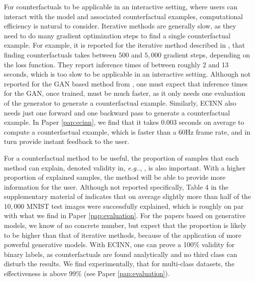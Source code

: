 \documentclass[11pt,a4paper,twoside,openright,final]{memoir}
\makeatletter
\DeclareRobustCommand\onedot{\futurelet\@let@token\@onedot}
\def\@onedot{\ifx\@let@token.\else.\null\fi\xspace}
\def\eg{\emph{e.g}\onedot} \def\Eg{\emph{E.g}\onedot}
\newcommand*{\paperref}[1]{Paper \hyperref[#1]{\ref{#1}}}
\makeatother
\begin{document}
For counterfactuals to be applicable in an interactive setting, where users can interact with the model and associated counterfactual examples, computational efficiency is natural to consider.
Iterative methods are generally slow, as they need to do many gradient optimization steps to find a single counterfactual example.
For example, it is reported for the iterative method described in \cite{VanLooveren2019}, that finding counterfactuals takes between $500$ and $5,000$ gradient steps, depending on the loss function. 
They report inference times of between roughly 2 and 13 seconds, which is too slow to be applicable in an interactive setting.
Although not reported for the GAN based method from \cite{Singla2019}, one must expect that inference times for the GAN, once trained, must be much faster, as it only needs one evaluation of the generator to generate a counterfactual example.
Similarly, ECINN also needs just one forward and one backward pass to generate a counterfactual example.
In \paperref{pap:ecinn}, we find that it takes $0.003$ seconds on average to compute a counterfactual example, which is faster than a 60Hz frame rate, and in turn provide instant feedback to the user.

For a counterfactual method to be useful, the proportion of samples that each method can explain, denoted validity in, \eg, \cite{Mothilal2020}, is also important.
With a higher proportion of explained samples, the method will be able to provide more information for the user.
Although not reported specifically, Table 4 in the supplementary material of \citet{VanLooveren2019} indicates that on average slightly more than half of the $10,000$ MNIST test images were successfully explained, which is roughly on par with what we find in \paperref{pap:evaluation}.
For the papers based on generative models, we know of no concrete number, but expect that the proportion is likely to be higher than that of iterative methods, because of the application of more powerful generative models. 
With ECINN, one can prove a 100\% validity for binary labels, as counterfactuals are found analytically and no third class can disturb the results. 
We find experimentally, that for multi-class datasets, the effectiveness is above 99\% (see \paperref{pap:evaluation}). 
\end{document}
